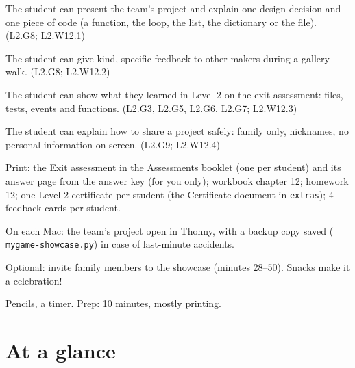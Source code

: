 
\begin{objectives}
  \item The student can present the team's project and explain one design decision and one piece of code (a function, the loop, the list, the dictionary or the file). (L2.G8; L2.W12.1)
  \item The student can give kind, specific feedback to other makers during a gallery walk. (L2.G8; L2.W12.2)
  \item The student can show what they learned in Level 2 on the exit assessment: files, tests, events and functions. (L2.G3, L2.G5, L2.G6, L2.G7; L2.W12.3)
  \item The student can explain how to share a project safely: family only, nicknames, no personal information on screen. (L2.G9; L2.W12.4)
\end{objectives}

\begin{materials}
  \item Print: the Exit assessment in the Assessments booklet (one per student) and its answer page from the answer key (for you only); workbook chapter 12; homework 12; one Level 2 certificate per student (the Certificate document in \texttt{extras}); 4 feedback cards per student.
  \item On each Mac: the team's project open in Thonny, with a backup copy saved ( \texttt{mygame-showcase.py}) in case of last-minute accidents.
  \item Optional: invite family members to the showcase (minutes 28--50). Snacks make it a celebration!
  \item Pencils, a timer. Prep: 10 minutes, mostly printing.
\end{materials}

\section{At a glance}
\begin{timeplan}
\end{timeplan}

